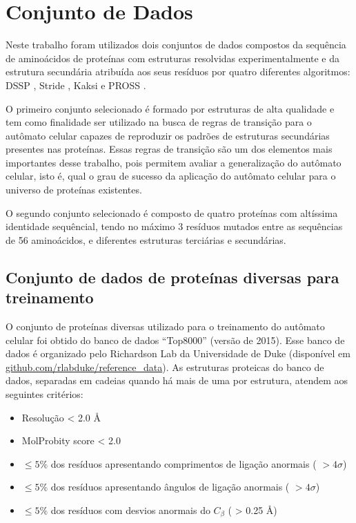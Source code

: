 \chapter{Conjunto de Dados}

Neste trabalho foram utilizados dois conjuntos de dados compostos da sequência de aminoácidos de proteínas com estruturas resolvidas experimentalmente e da estrutura secundária atribuída aos seus resíduos por quatro diferentes algoritmos: DSSP \cite{Kabsch1983a}, Stride \cite{Frishman1995a}, Kaksi \cite{Martin2005b} e PROSS \cite{Srinivasan1999b}.

O primeiro conjunto selecionado é formado por  estruturas de alta qualidade e tem como finalidade ser utilizado na busca de regras de transição para o autômato celular capazes de reproduzir os padrões de estruturas secundárias presentes nas proteínas. Essas regras de transição são um dos elementos mais importantes desse trabalho, pois permitem avaliar a generalização do autômato celular, isto é, qual o grau de sucesso da aplicação do autômato celular para o universo de proteínas existentes.

O segundo conjunto selecionado é composto de quatro proteínas com altíssima identidade sequêncial, tendo no máximo 3 resíduos mutados entre as sequências de 56 aminoácidos, e diferentes estruturas terciárias e secundárias. 


\section{Conjunto de dados de proteínas diversas para treinamento}

O conjunto de proteínas diversas utilizado para o treinamento do autômato celular foi obtido do banco de dados “Top8000” (versão de 2015). Esse banco de dados é organizado pelo Richardson Lab da Universidade de Duke (disponível em \href{https://github.com/rlabduke/reference_data}{github.com/rlabduke/reference\_data}). As estruturas proteicas do banco de dados, separadas em cadeias quando há mais de uma por estrutura, atendem aos seguintes critérios:

\begin{itemize}
	\item{Resolução < 2.0 \AA}
	\item{MolProbity score < 2.0}
	\item{$\le 5 \%$ dos resíduos apresentando comprimentos de ligação anormais ( $> 4\sigma$)}
	\item{$\le 5 \%$ dos resíduos apresentando ângulos de ligação anormais ( $> 4\sigma$)}
	\item{$\le 5 \%$ dos resíduos com desvios anormais do  $C_\beta$ ( > 0.25 \AA)}
\end{itemize}

